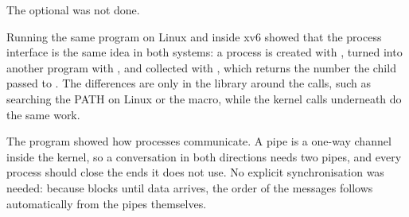 \documentclass[11pt,a4paper]{article}
\begin{document}
The optional  was not done.


Running the same program on Linux and inside xv6 showed that the process interface is the same
idea in both systems: a process is created with , turned into another program with
, and collected with , which returns the number the child passed to
. The differences are only in the library around the calls, such as 
searching the PATH on Linux or the  macro, while the kernel calls underneath do
the same work.

The  program showed how processes communicate. A pipe is a one-way channel inside
the kernel, so a conversation in both directions needs two pipes, and every process should close
the ends it does not use. No explicit synchronisation was needed: because  blocks
until data arrives, the order of the messages follows automatically from the pipes themselves.
\end{document}
